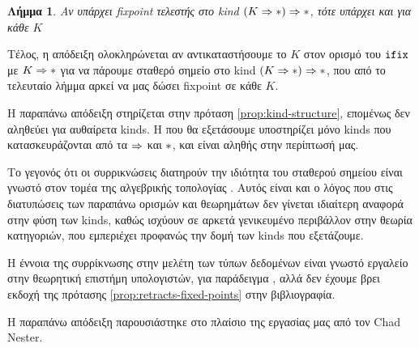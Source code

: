     \newtheorem{corollary}{Λήμμα}
    \begin{corollary}
    Αν υπάρχει fixpoint τελεστής στο kind $(K \Rightarrow \operatorname{\ast}) \Rightarrow \operatorname{\ast}$, τότε υπάρχει
    και για κάθε $K$
    \end{corollary}


Τέλος, η απόδειξη ολοκληρώνεται αν αντικαταστήσουμε το $K$ στον ορισμό του $\operatorname{\texttt{ifix}}$ με 
$K \Rightarrow \operatorname{\ast}$ για να πάρουμε σταθερό σημείο στο kind $(K \Rightarrow \operatorname{\ast}) \Rightarrow \operatorname{\ast}$,
που από το τελευταίο λήμμα αρκεί να μας δώσει fixpoint σε κάθε $K$. 



Η παραπάνω απόδειξη στηρίζεται στην πρόταση \ref{prop:kind-structure},
επομένως δεν αληθεύει για αυθαίρετα kinds. Η \FOMF{} που θα εξετάσουμε
υποστηρίζει μόνο kinds που κατασκευράζονται από τα $\Rightarrow$ και $\operatorname{\ast}$,
και είναι αληθής στην περίπτωσή μας.

Το γεγονός ότι οι συρρικνώσεις διατηρούν την ιδιότητα του σταθερού σημείου είναι γνωστό στον
τομέα της αλγεβρικής τοπολογίας \cite{eilenberg-steenrod}. Αυτός είναι και ο λόγος που στις διατυπώσεις
των παραπάνω ορισμών και θεωρημάτων δεν γίνεται ιδιαίτερη αναφορά στην φύση των kinds, καθώς
ισχύουν σε αρκετά γενικευμένο περιβάλλον στην θεωρία κατηγοριών, που εμπεριέχει προφανώς την 
δομή των kinds που εξετάζουμε.

Η έννοια της συρρίκνωσης στην μελέτη των τύπων δεδομένων είναι γνωστό εργαλείο στην θεωρητική 
επιστήμη υπολογιστών, για παράδειγμα
 \cite{stirling}, αλλά δεν έχουμε βρει εκδοχή της πρότασης \ref{prop:retracts-fixed-points} στην βιβλιογραφία.

Η παραπάνω απόδειξη παρουσιάστηκε στο πλαίσιο της εργασίας μας από τον Chad Nester.